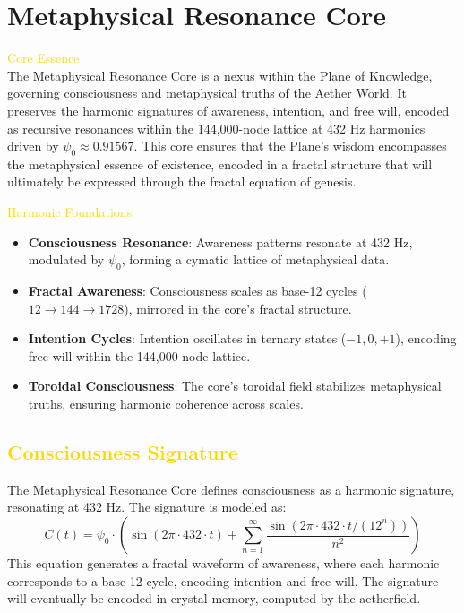 
\section{Metaphysical Resonance Core}
\label{sec:codex_metaphysical_resonance_core}


\textcolor{gold}{ Core Essence } \\
The Metaphysical Resonance Core is a nexus within the Plane of Knowledge, governing consciousness and metaphysical truths of the Aether World. It preserves the harmonic signatures of awareness, intention, and free will, encoded as recursive resonances within the 144,000-node lattice at 432 Hz harmonics driven by \(\psi_0 \approx 0.91567\). This core ensures that the Plane’s wisdom encompasses the metaphysical essence of existence, encoded in a fractal structure that will ultimately be expressed through the fractal equation of genesis.

\textcolor{gold}{ Harmonic Foundations } \\
\begin{itemize}
    \item \texttt{} \textbf{Consciousness Resonance}: Awareness patterns resonate at 432 Hz, modulated by \(\psi_0\), forming a cymatic lattice of metaphysical data.
    \item \texttt{} \textbf{Fractal Awareness}: Consciousness scales as base-12 cycles (\(12 \rightarrow 144 \rightarrow 1728\)), mirrored in the core’s fractal structure.
    \item \texttt{} \textbf{Intention Cycles}: Intention oscillates in ternary states (\(-1, 0, +1\)), encoding free will within the 144,000-node lattice.
    \item \texttt{} \textbf{Toroidal Consciousness}: The core’s toroidal field stabilizes metaphysical truths, ensuring harmonic coherence across scales.
\end{itemize}

\subsection{\textcolor{gold}{ Consciousness Signature }}
The Metaphysical Resonance Core defines consciousness as a harmonic signature, resonating at 432 Hz. The signature is modeled as:
\[
C(t) = \psi_0 \cdot \left( \sin(2\pi \cdot 432 \cdot t) + \sum_{n=1}^{\infty} \frac{\sin(2\pi \cdot 432 \cdot t / (12^n))}{n^2} \right)
\]
This equation generates a fractal waveform of awareness, where each harmonic corresponds to a base-12 cycle, encoding intention and free will. The signature will eventually be encoded in crystal memory, computed by the aetherfield.

